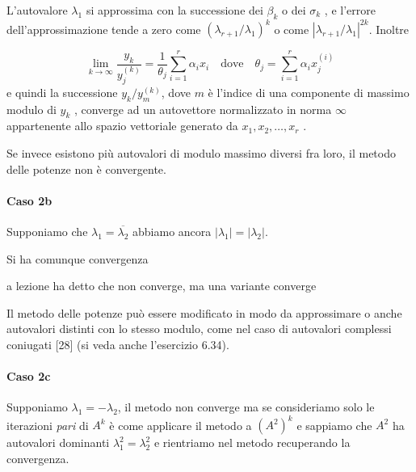 L'autovalore $\lambda_1$ si approssima con la successione dei
$\beta_k$ o dei $\sigma_k$ , e l'errore dell'approssimazione tende a zero come
$(\lambda_{r+1} / \lambda_1 )^k$ o come $|\lambda_{r+1}/\lambda_1|^{2k}$. 
Inoltre

$$
\lim_{k \to \infty} \dfrac{y_k}{y_j^{(k)}} =
\dfrac{1}{\theta_j} \displaystyle \sum_{i=1}^{r} \alpha_i x_i
\quad
\text{dove}
\quad
\theta_j = \displaystyle \sum_{i=1}^{r} \alpha_i x_j^{(i)}
$$
e quindi la successione ${y_k /y_m^{(k)} }$, dove $m$ \`e l'indice di
una componente di massimo modulo di $y_k$ , converge ad un autovettore
normalizzato in norma $\infty$ appartenente allo spazio vettoriale
generato da $x_1 , x_2 , \ldots , x_r$ .

Se invece esistono pi\`u autovalori di modulo massimo diversi fra loro, il
metodo delle potenze non \`e convergente.

\paragraph{Caso 2b}
Supponiamo che $\lambda_1 = \overline{\lambda_2}$ abbiamo ancora
$|\lambda_1| = |\lambda_2|$.

Si ha comunque convergenza

\begin{notes}
a lezione ha detto che non converge, ma una variante converge\\
\end{notes}

\begin{notes}
  Il metodo delle potenze può essere modificato in modo da approssimare
  o anche autovalori distinti con lo stesso modulo, come nel caso di
  autovalori complessi coniugati [28] (si veda anche l’esercizio
  6.34).
\end{notes}

\paragraph{Caso 2c}
Supponiamo $\lambda_1 = - \lambda_2$, il metodo non converge ma se
consideriamo solo le iterazioni \emph{pari} di $A^k$ è come applicare
il metodo a $(A^2)^k$ e sappiamo che $A^2$ ha autovalori dominanti
$\lambda_1^{2} = \lambda_2^{2}$ e rientriamo nel metodo recuperando la
convergenza.

